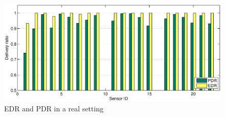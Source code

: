 \begin{figure}[htb]
  \centering
  \includegraphics[width=\textwidth]{../../sw/pc/matlab/testbed-result/real}
  \caption{EDR and PDR in a real setting}
  \label{fig:real-edr-pdr}
\end{figure}

